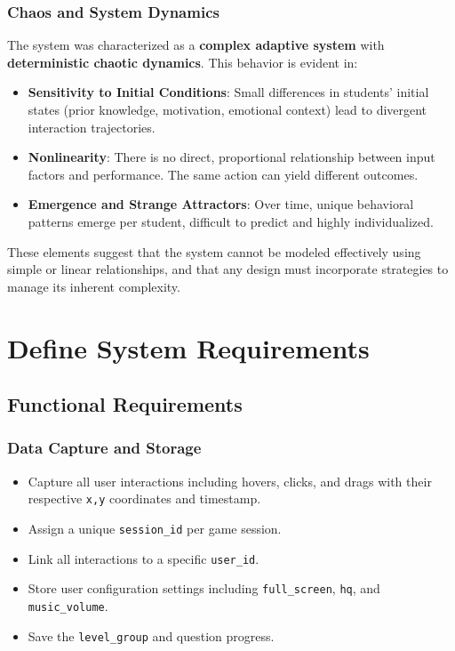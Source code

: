 \documentclass{article}
\newcommand{\reqnum}[1]{\textbf{\underline{RF-#1}}}
\begin{document}
\subsubsection*{Chaos and System Dynamics}

The system was characterized as a \textbf{complex adaptive system} with \textbf{deterministic chaotic dynamics}. This behavior is evident in:

\begin{itemize}
    \item \textbf{Sensitivity to Initial Conditions}: Small differences in students’ initial states (prior knowledge, motivation, emotional context) lead to divergent interaction trajectories.
    
    \item \textbf{Nonlinearity}: There is no direct, proportional relationship between input factors and performance. The same action can yield different outcomes.
    
    \item \textbf{Emergence and Strange Attractors}: Over time, unique behavioral patterns emerge per student, difficult to predict and highly individualized.
\end{itemize}

These elements suggest that the system cannot be modeled effectively using simple or linear relationships, and that any design must incorporate strategies to manage its inherent complexity.


\section{Define System Requirements}

\subsection{Functional Requirements}

\subsubsection{Data Capture and Storage}
\begin{itemize}
    \item[\reqnum{001}] Capture all user interactions including hovers, clicks, and drags with their respective \texttt{x,y} coordinates and timestamp.
    \item[\reqnum{002}] Assign a unique \texttt{session\_id} per game session.
    \item[\reqnum{003}] Link all interactions to a specific \texttt{user\_id}.
    \item[\reqnum{004}] Store user configuration settings including \texttt{full\_screen}, \texttt{hq}, and \texttt{music\_volume}.
    \item[\reqnum{005}] Save the \texttt{level\_group} and question progress.
\end{itemize}
\end{document}
